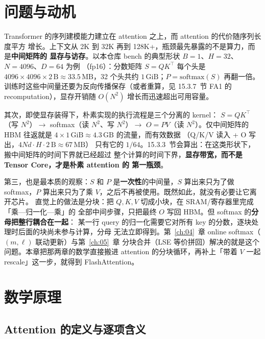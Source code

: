 \section{问题与动机}

Transformer 的序列建模能力建立在 attention 之上，而 attention 的代价随序列长度平方
增长。上下文从 2K 到 32K 再到 128K+，瓶颈最先暴露的不是算力，而是\textbf{中间矩阵的
显存与访存}。以本仓库 bench 的典型形状 $B{=}1$、$H{=}32$、$N{=}4096$、$D{=}64$ 为例
（fp16）：分数矩阵 $S = QK^{\top}$ 每个头是 $4096 \times 4096 \times 2\,\mathrm{B}
\approx 33.5\,\mathrm{MB}$，32 个头共约 $1\,\mathrm{GiB}$；$P = \mathrm{softmax}(S)$
再翻一倍。训练时这些中间量还要为反向传播保存（或者重算，见 15.3.7~节 FA1 的
recomputation），显存开销随 $O(N^{2})$ 增长而迅速超出可用容量。

其次，即使显存装得下，朴素实现的执行流程是三个分离的 kernel：
$S = QK^{\top}$（写 $N^2$）$\to$ softmax（读 $N^2$、写 $N^2$）$\to$
$O = PV$（读 $N^2$）。仅中间矩阵的 HBM 往返就是
$4 \times 1\,\mathrm{GiB} \approx 4.3\,\mathrm{GB}$ 的流量，而有效数据
（Q/K/V 读入 + O 写出，$4Nd \cdot H \cdot 2\,\mathrm{B} \approx 67\,\mathrm{MB}$）
只有它的 $1/64$。15.3.3~节会算出：在这类形状下，搬中间矩阵的时间下界就已经超过
整个计算的时间下界，\textbf{显存带宽，而不是 Tensor Core，才是朴素 attention 的
第一瓶颈}。

第三，也是最本质的观察：$S$ 和 $P$ 是\textbf{一次性}的中间量，$S$ 算出来只为了做
softmax，$P$ 算出来只为了乘 $V$，之后不再被使用。既然如此，就没有必要让它离开芯片。
直觉上的做法是分块：把 $Q,K,V$ 切成小块，在 SRAM/寄存器里完成「乘—归一化—乘」的
全部中间步骤，只把最终 $O$ 写回 HBM。但 softmax 的\textbf{分母把整行耦合在一起}：
某一行 query 的归一化需要它对所有 key 的分数，逐块处理时后面的块尚未参与计算，分母
无法立即得到。第~\ref{ch:04}~章 online softmax（$(m,\ell)$ 联动更新）与第~\ref{ch:05}~章
分块合并（LSE 等价拼回）解决的就是这个问题。本章把那两章的数学直接搬进
attention 的分块循环，再补上「带着 $V$ 一起 rescale」这一步，就得到 FlashAttention。

\section{数学原理}

\subsection{Attention 的定义与逐项含义}

